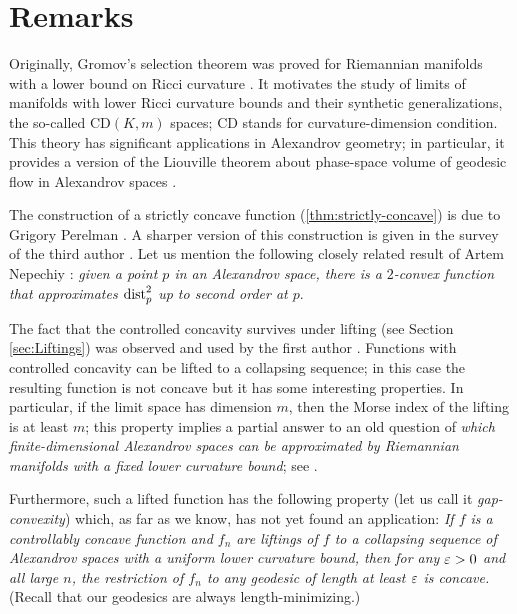 \section{Remarks}

Originally, Gromov's selection theorem was proved for Riemannian manifolds with a lower bound on Ricci curvature \cite{gromov1981}.
It motivates the study of limits of manifolds with lower Ricci curvature bounds and their synthetic generalizations, the so-called $\mathrm{CD}(K,m)$ spaces; $\mathrm{CD}$ stands for curvature-dimension condition.
This theory has significant applications in Alexandrov geometry;
in particular, it provides a version of the Liouville theorem about phase-space volume of geodesic flow in Alexandrov spaces \cite{brue-mondino-semola}.

The construction of a strictly concave function (\ref{thm:strictly-concave}) is due to Grigory Perelman \cite{perelman1993,perelman-petrunin}.
A sharper version of this construction is given in the survey of the third author \cite[7.2]{petrunin:survey}.
Let us mention the following closely related result of Artem Nepechiy \cite{nepechiy2019}:
\textit{given a point $p$ in an Alexandrov space, there is a $2$-convex function that approximates $\mathrm{dist}_p^2$ up to second order at $p$}.

The fact that the controlled concavity survives under lifting (see Section \ref{sec:Liftings}) was observed and used by the first author \cite[4.2]{kapovitch2002}.
Functions with controlled concavity can be lifted to a collapsing sequence; in this case the resulting function is not concave but it has some interesting properties.
In particular, if the limit space has dimension $m$, then the Morse index of the lifting is at least $m$;
this property implies a partial answer to an old question of \textit{which finite-dimensional Alexandrov spaces can be approximated by Riemannian manifolds with a fixed lower curvature bound}; see \cite{kapovitch2005}.

Furthermore, such a lifted function has the following property (let us call it \emph{gap-convexity}) which, as far as we know, has not yet found an application:
\textit{If $f$ is a controllably concave function and $f_n$ are liftings of $f$ to a collapsing sequence of Alexandrov spaces with a uniform lower curvature bound, then for any $\varepsilon>0$ and all large $n$, the restriction of $f_n$ to any geodesic of length at least $\varepsilon$ is concave.}
(Recall that our geodesics are always length-minimizing.)

